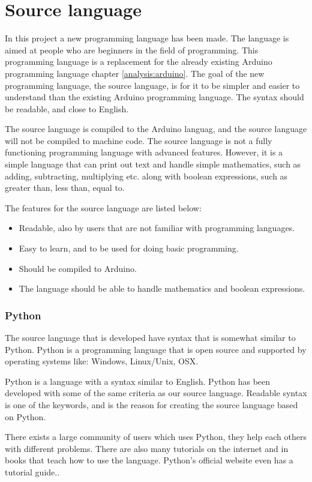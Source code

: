 \chapter{Source language}\label{analysis:source-language}
In this project a new programming language has been made. The language is aimed at people who are beginners in the field of programming. This programming language is a replacement for the already existing Arduino programming language chapter \ref{analysis:arduino}.
The goal of the new programming language, the source language, is for it to be simpler and easier to understand than the existing Arduino programming language. The syntax should be readable, and close to English.

The source language is compiled to the Arduino languag, and the source language will not be compiled to machine code. The source language is not a fully functioning programming language with advanced features. However, it is a simple language that can print out text and handle simple mathematics, such as adding, subtracting, multiplying etc. along with boolean expressions, such as greater than, less than, equal to.

The features for the source language are listed below:
\begin{itemize}
	\item Readable, also by users that are not familiar with programming languages.
	\item Easy to learn, and to be used for doing basic programming.
	\item Should be compiled to Arduino.
	\item The language should be able to handle mathematics and boolean expressions.
\end{itemize}

\subsection{Python}
The source language that is developed have syntax that is somewhat similar to Python. Python is a programming language that is open source and supported by operating systems like: Windows, Linux/Unix, OSX.

Python is a language with a syntax similar to English.
Python has been developed with some of the same criteria as our source language. Readable syntax is one of the keywords, and is the reason for creating the source language based on Python.
 
\cite{python:official:about}
There exists a large community of users which uses Python, they help each others with different problems. There are also many tutorials on the internet and in books that teach how to use the language. Python's official website even has a tutorial guide.\cite{python:official:tutorial}.